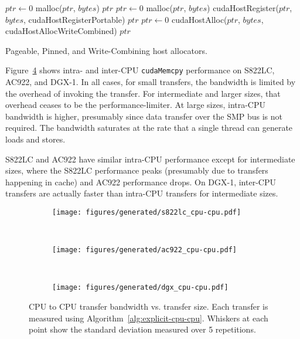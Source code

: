 \begin{algorithm}[H]
	\begin{algorithmic}[1]
		\Statex
		\State $ptr \gets 0$
		\State malloc($ptr$, $bytes$)
		\State \Return $ptr$
		\EndFunction
		\Statex
		\State $ptr \gets 0$
		\State malloc($ptr$, $bytes$)
		\State cudaHostRegister($ptr$, $bytes$, cudaHostRegisterPortable)
		\State \Return $ptr$
		\EndFunction
		\Statex
		\State $ptr \gets 0$
		\State cudaHostAlloc($ptr$, $bytes$, cudaHostAllocWriteCombined)
		\State \Return $ptr$
		\EndFunction
		
	\end{algorithmic}
	\caption[Pageable, Pinned, and Write-Combining host allocators.]{
        Pageable, Pinned, and Write-Combining host allocators.
	}
	\label{alg:host-allocators}
\end{algorithm}

Figure~\ref{fig:explicit-cpu-cpu} shows intra- and inter-CPU \texttt{cudaMemcpy} performance on S822LC, AC922, and DGX-1.
In all cases, for small transfers, the bandwidth is limited by the overhead of invoking the transfer.
For intermediate and larger sizes, that overhead ceases to be the performance-limiter.
At large sizes, intra-CPU bandwidth is higher, presumably since data transfer over the SMP bus is not required.
The bandwidth saturates at the rate that a single thread can generate loads and stores.

S822LC and AC922 have similar intra-CPU performance except for intermediate sizes, where the S822LC performance peaks (presumably due to transfers happening in cache) and AC922 performance drops.
On DGX-1, inter-CPU transfers are actually faster than intra-CPU transfers for intermediate sizes.

\begin{figure}[H]
	\centering
	\begin{subfigure}[b]{0.31\textwidth}
		\texttt{[image: figures/generated/s822lc\_cpu-cpu.pdf]}
		\caption{}
		\label{fig:s822lc-cpu0-cpu1-dst}
	\end{subfigure}
	~
	\begin{subfigure}[b]{0.31\textwidth}
		\texttt{[image: figures/generated/ac922\_cpu-cpu.pdf]}
		\caption{}
		\label{fig:ac922-cpu0-cpu1-dst}
	\end{subfigure}
	~
	\begin{subfigure}[b]{0.31\textwidth}
		\texttt{[image: figures/generated/dgx\_cpu-cpu.pdf]}
		\caption{}
		\label{fig:dgx-cpu0-cpu1-dst}
	\end{subfigure}
	\caption[CPU to CPU transfer bandwidth]{
		CPU to CPU transfer bandwidth vs. transfer size.
		Each transfer is measured using Algorithm~\ref{alg:explicit-cpu-cpu}.
		Whiskers at each point show the standard deviation measured over 5 repetitions.
	}
	\label{fig:explicit-cpu-cpu}
\end{figure}

